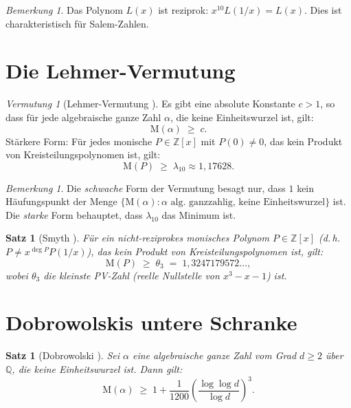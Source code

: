 \documentclass[12pt,a4paper]{amsart}
\newtheorem{satz}[theorem]{Satz}
\theoremstyle{definition}
\theoremstyle{remark}
\newtheorem{bemerkung}[theorem]{Bemerkung}
\newtheorem{vermutung}[theorem]{Vermutung}
\newcommand{\Z}{\mathbb{Z}}
\newcommand{\Q}{\mathbb{Q}}
\newcommand{\M}{\mathrm{M}}
\begin{document}
\begin{bemerkung}
  Das Polynom $L(x)$ ist reziprok: $x^{10}L(1/x) = L(x)$.
  Dies ist charakteristisch für Salem-Zahlen.
\end{bemerkung}

\section{Die Lehmer-Vermutung}\label{sec:vermutung}

\begin{vermutung}[Lehmer-Vermutung \cite{Lehmer1933}]\label{verm:lehmer}
  Es gibt eine absolute Konstante $c > 1$, so dass für jede algebraische ganze Zahl
  $\alpha$, die keine Einheitswurzel ist, gilt:
  \[
    \M(\alpha) \;\geq\; c.
  \]
  Stärkere Form: Für jedes monische $P \in \Z[x]$ mit $P(0) \neq 0$, das kein Produkt
  von Kreisteilungspolynomen ist, gilt:
  \[
    \M(P) \;\geq\; \lambda_{10} \approx 1{,}17628.
  \]
\end{vermutung}

\begin{bemerkung}
  Die \emph{schwache} Form der Vermutung besagt nur, dass $1$ kein Häufungspunkt der
  Menge $\{\M(\alpha) : \alpha \text{ alg.\ ganzzahlig, keine Einheitswurzel}\}$ ist.
  Die \emph{starke} Form behauptet, dass $\lambda_{10}$ das Minimum ist.
\end{bemerkung}

\begin{satz}[Smyth \cite{Smyth1971}]
  Für ein nicht-reziprokes monisches Polynom $P \in \Z[x]$ (d.\,h.\ $P \neq x^{\deg P}P(1/x)$),
  das kein Produkt von Kreisteilungspolynomen ist, gilt:
  \[
    \M(P) \;\geq\; \theta_3 \;=\; 1{,}3247179572\ldots,
  \]
  wobei $\theta_3$ die kleinste PV-Zahl (reelle Nullstelle von $x^3-x-1$) ist.
\end{satz}

\section{Dobrowolskis untere Schranke}\label{sec:dobrowolski}

\begin{satz}[Dobrowolski \cite{Dobrowolski1979}]\label{satz:dobro}
  Sei $\alpha$ eine algebraische ganze Zahl vom Grad $d \geq 2$ über $\Q$, die keine
  Einheitswurzel ist. Dann gilt:
  \[
    \M(\alpha) \;\geq\; 1 + \frac{1}{1200}\left(\frac{\log\log d}{\log d}\right)^3.
  \]
\end{satz}
\end{document}
